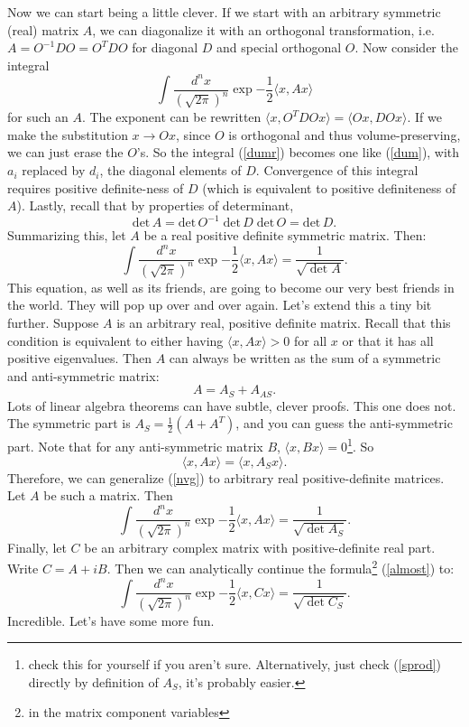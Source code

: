 \documentclass{book}
\begin{document}
Now we can start being a little clever. If we start with an arbitrary symmetric (real) matrix $A$, we can diagonalize it with an orthogonal transformation, i.e. $A = O^{-1} D O = O^T D O$ for diagonal $D$ and special orthogonal $O$. Now consider the integral
\begin{equation} \label{dumr}
\int \frac{d^n x}{(\sqrt{2 \pi})^n} \exp{-\frac{1}{2} \langle x, A x \rangle}
\end{equation}
for such an $A$. The exponent can be rewritten $\langle x, O^T D O x \rangle = \langle Ox, D Ox \rangle$. If we make the substitution $x \to Ox$, since $O$ is orthogonal and thus volume-preserving, we can just erase the $O$'s. So the integral (\ref{dumr}) becomes one like (\ref{dum}), with $a_i$ replaced by $d_i$, the diagonal elements of $D$. Convergence of this integral requires positive definite-ness of $D$ (which is equivalent to positive definiteness of $A$). Lastly, recall that by properties of determinant, 
\[
\text{det} \, A = \text{det} \, O^{-1} \; \text{det} \, D \; \text{det} \, O = \text{det} \, D.
\]
Summarizing this, let $A$ be a real positive definite symmetric matrix. Then:
\begin{equation} \label{nvg}
\boxed{\int \frac{d^n x}{(\sqrt{2 \pi})^n} \exp{-\frac{1}{2} \langle x, A x \rangle} = \frac{1}{\sqrt{\det A}}.}
\end{equation}
This equation, as well as its friends, are going to become our very best friends in the world. They will pop up over and over again. Let's extend this a tiny bit further. Suppose $A$ is an arbitrary real, positive definite matrix. Recall that this condition is equivalent to either having $\langle x, A x \rangle > 0$ for all $x$ or that it has all positive eigenvalues. Then $A$ can always be written as the sum of a symmetric and anti-symmetric matrix:
\[
A = A_S + A_{AS}.
\]
Lots of linear algebra theorems can have subtle, clever proofs. This one does not. The symmetric part is $A_S = \frac{1}{2}\left(A + A^T \right)$, and you can guess the anti-symmetric part. Note that for any anti-symmetric matrix $B$, $\langle x, B x \rangle = 0$\footnote{check this for yourself if you aren't sure. Alternatively, just check (\ref{sprod}) directly by definition of $A_S$, it's probably easier.}. So 
\begin{equation} \label{sprod}
\langle x, A x \rangle = \langle x, A_S x \rangle.
\end{equation}
Therefore, we can generalize (\ref{nvg}) to arbitrary real positive-definite matrices. Let $A$ be such a matrix. Then
\begin{equation} \label{almost}
\int \frac{d^n x}{(\sqrt{2 \pi})^n} \exp{-\frac{1}{2} \langle x, A x \rangle} = \frac{1}{\sqrt{\det A_S}}.
\end{equation}
Finally, let $C$ be an arbitrary complex matrix with positive-definite real part. Write $C = A + i B$. Then we can analytically continue the formula\footnote{in the matrix component variables} (\ref{almost}) to:
\begin{equation} \label{nvgf}
\boxed{\int \frac{d^n x}{(\sqrt{2 \pi})^n} \exp{-\frac{1}{2} \langle x, C x \rangle} = \frac{1}{\sqrt{\det C_S}}.}
\end{equation}
Incredible. Let's have some more fun.
\end{document}
